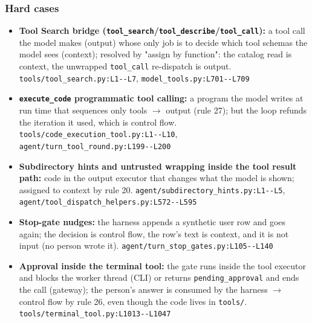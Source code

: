 \subsubsection*{Hard cases}
\begin{itemize}
\item \textbf{Tool Search bridge (\texttt{tool\_\allowbreak{}search}/\texttt{tool\_\allowbreak{}describe}/\texttt{tool\_\allowbreak{}call}):} a tool call the model makes (output) whose only job is to decide which tool schemas the model sees (context); resolved by "assign by function": the catalog read is context, the unwrapped \texttt{tool\_\allowbreak{}call} re-dispatch is output. \texttt{tools/\allowbreak{}tool\_\allowbreak{}search.\allowbreak{}py:\allowbreak{}L1-\allowbreak{}-\allowbreak{}L7}, \texttt{model\_\allowbreak{}tools.\allowbreak{}py:\allowbreak{}L701-\allowbreak{}-\allowbreak{}L709}
\item \textbf{\texttt{execute\_\allowbreak{}code} programmatic tool calling:} a program the model writes at run time that sequences only tools $\rightarrow$ output (rule 27); but the loop refunds the iteration it used, which is control flow. \texttt{tools/\allowbreak{}code\_\allowbreak{}execution\_\allowbreak{}tool.\allowbreak{}py:\allowbreak{}L1-\allowbreak{}-\allowbreak{}L10}, \texttt{agent/\allowbreak{}turn\_\allowbreak{}tool\_\allowbreak{}round.\allowbreak{}py:\allowbreak{}L199-\allowbreak{}-\allowbreak{}L200}
\item \textbf{Subdirectory hints and untrusted wrapping inside the tool result path:} code in the output executor that changes what the model is shown; assigned to context by rule 20. \texttt{agent/\allowbreak{}subdirectory\_\allowbreak{}hints.\allowbreak{}py:\allowbreak{}L1-\allowbreak{}-\allowbreak{}L5}, \texttt{agent/\allowbreak{}tool\_\allowbreak{}dispatch\_\allowbreak{}helpers.\allowbreak{}py:\allowbreak{}L572-\allowbreak{}-\allowbreak{}L595}
\item \textbf{Stop-gate nudges:} the harness appends a synthetic user row and goes again; the decision is control flow, the row's text is context, and it is not input (no person wrote it). \texttt{agent/\allowbreak{}turn\_\allowbreak{}stop\_\allowbreak{}gates.\allowbreak{}py:\allowbreak{}L105-\allowbreak{}-\allowbreak{}L140}
\item \textbf{Approval inside the terminal tool:} the gate runs inside the tool executor and blocks the worker thread (CLI) or returns \texttt{pending\_\allowbreak{}approval} and ends the call (gateway); the person's answer is consumed by the harness $\rightarrow$ control flow by rule 26, even though the code lives in \texttt{tools/\allowbreak{}}. \texttt{tools/\allowbreak{}terminal\_\allowbreak{}tool.\allowbreak{}py:\allowbreak{}L1013-\allowbreak{}-\allowbreak{}L1047}

\end{itemize}

